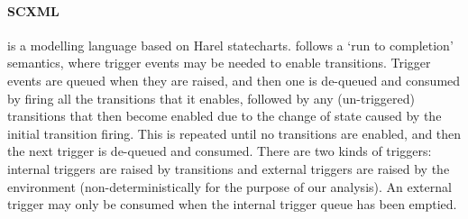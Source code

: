 

\paragraph{SCXML} is a modelling language based on Harel statecharts\cite{scxmlwebsite}.
\SCXML follows a `run to completion' semantics, where trigger events
may be needed to enable transitions. Trigger events are queued when
they are raised, and then one is de-queued and consumed by firing all
the transitions that it enables, followed by any (un-triggered)
transitions that then become enabled due to the change of state caused
by the initial transition firing. This is repeated until no
transitions are enabled, and then the next trigger is de-queued and
consumed. There are two kinds of triggers: internal triggers are
raised by transitions and external triggers are raised by the
environment (non-deterministically for the purpose of our
analysis). An external trigger may only be consumed when the internal
trigger queue has been emptied.



